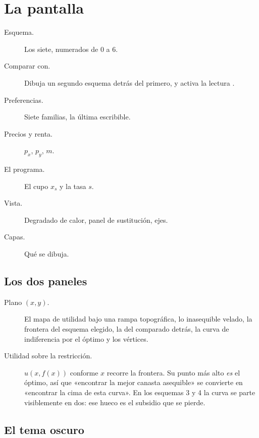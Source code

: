 \documentclass[11pt,a4paper]{appletmanual}
\begin{document}
\section{La pantalla}


\begin{description}
\item[Esquema.] Los siete, numerados de 0 a 6.
\item[Comparar con.] Dibuja un segundo esquema detrás del primero, y activa la
  lectura .
\item[Preferencias.] Siete familias, la última escribible.
\item[Precios y renta.] $p_x$, $p_y$, $m$.
\item[El programa.] El cupo $x_s$ y la tasa $s$.
\item[Vista.] Degradado de calor, panel de sustitución, ejes.
\item[Capas.] Qué se dibuja.
\end{description}

\subsection{Los dos paneles}

\begin{description}
\item[Plano $(x, y)$.] El mapa de utilidad bajo una rampa topográfica, lo
  inasequible velado, la frontera del esquema elegido, la del comparado detrás,
  la curva de indiferencia por el óptimo y los vértices.
\item[Utilidad sobre la restricción.] $u(x, f(x))$ conforme $x$ recorre la
  frontera. Su punto más alto \emph{es} el óptimo, así que «encontrar la mejor
  canasta asequible» se convierte en «encontrar la cima de esta curva». En los
  esquemas 3 y 4 la curva se parte visiblemente en dos: ese hueco es el
  subsidio que se pierde.
\end{description}


\subsection{El tema oscuro}

\end{document}
